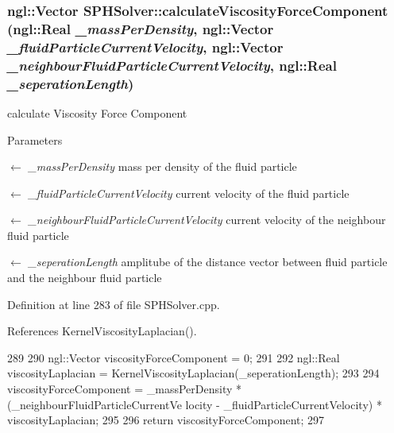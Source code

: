 \hypertarget{class_s_p_h_solver_a5913e7c1cd5a66c51eb03762025c0782}{
\subsubsection[{calculateViscosityForceComponent}]{\setlength{\rightskip}{0pt plus 5cm}ngl::Vector SPHSolver::calculateViscosityForceComponent (ngl::Real {\em \_\-massPerDensity}, \/  ngl::Vector {\em \_\-fluidParticleCurrentVelocity}, \/  ngl::Vector {\em \_\-neighbourFluidParticleCurrentVelocity}, \/  ngl::Real {\em \_\-seperationLength})}}
\label{class_s_p_h_solver_a5913e7c1cd5a66c51eb03762025c0782}


calculate Viscosity Force Component 


\begin{DoxyParams}{Parameters}
\item[\mbox{$\leftarrow$} {\em \_\-massPerDensity}]mass per density of the fluid particle \item[\mbox{$\leftarrow$} {\em \_\-fluidParticleCurrentVelocity}]current velocity of the fluid particle \item[\mbox{$\leftarrow$} {\em \_\-neighbourFluidParticleCurrentVelocity}]current velocity of the neighbour fluid particle \item[\mbox{$\leftarrow$} {\em \_\-seperationLength}]amplitube of the distance vector between fluid particle and the neighbour fluid particle \end{DoxyParams}


Definition at line 283 of file SPHSolver.cpp.



References KernelViscosityLaplacian().




\begin{DoxyCode}
289 {
290     ngl::Vector viscosityForceComponent = 0;
291 
292     ngl::Real viscosityLaplacian = KernelViscosityLaplacian(_seperationLength);
293 
294     viscosityForceComponent = _massPerDensity * (_neighbourFluidParticleCurrentVe
      locity - _fluidParticleCurrentVelocity) * viscosityLaplacian;
295 
296     return viscosityForceComponent;
297 }
\end{DoxyCode}




